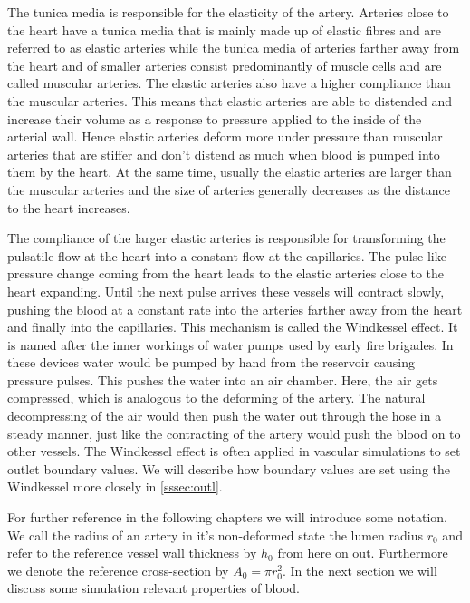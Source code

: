 \documentclass[a4paper, oneside]{discothesis}
\begin{document}
The tunica media is responsible for the elasticity of the artery.
Arteries close to the heart have a tunica media that is mainly made up of elastic fibres and are referred to as elastic arteries while the tunica media of arteries farther away from the heart and of smaller arteries consist predominantly of muscle cells and are called muscular arteries.
The elastic arteries also have a higher compliance than the muscular arteries.
This means that elastic arteries are able to distended and increase their volume as a response to pressure applied to the inside of the arterial wall.
Hence elastic arteries deform more under pressure than muscular arteries that are stiffer and don't distend as much when blood is pumped into them by the heart.
At the same time, usually the elastic arteries are larger than the muscular arteries and the size of arteries generally decreases as the distance to the heart increases.

The compliance of the larger elastic arteries is responsible for transforming the pulsatile flow at the heart into a constant flow at the capillaries.
The pulse-like pressure change coming from the heart leads to the elastic arteries close to the heart expanding.
Until the next pulse arrives these vessels will contract slowly, pushing the blood at a constant rate into the arteries farther away from the heart and finally into the capillaries.
This mechanism is called the Windkessel effect.
It is named after the inner workings of water pumps used by early fire brigades.
In these devices water would be pumped by hand from the reservoir causing pressure pulses.
This pushes the water into an air chamber.
Here, the air gets compressed, which is analogous to the deforming of the artery.
The natural decompressing of the air would then push the water out through the hose in a steady manner, just like the contracting of the artery would push the blood on to other vessels.
The Windkessel effect is often applied in vascular simulations to set outlet boundary values. \cite{köppl2023dimension}
We will describe how boundary values are set using the Windkessel more closely in \autoref{sssec:outl}.

For further reference in the following chapters we will introduce some notation.
We call the radius of an artery in it's non-deformed state the lumen radius $r_0$ and refer to the reference vessel wall thickness by $h_0$ from here on out.
Furthermore we denote the reference cross-section by $A_0 = \pi r_0^2$.
In the next section we will discuss some simulation relevant properties of blood.
\end{document}
